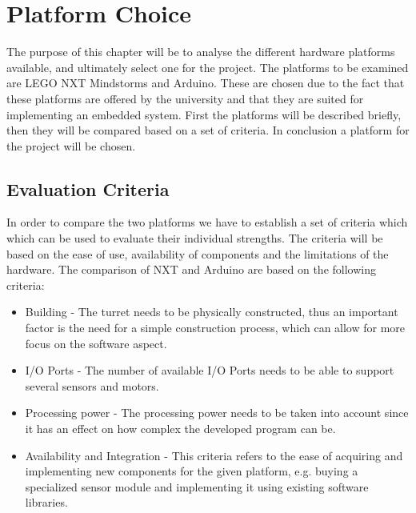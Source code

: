\chapter{Platform Choice}\label{PlatformC}
The purpose of this chapter will be to analyse the different hardware platforms
available, and ultimately select one for the project. The platforms to be examined are LEGO
NXT Mindstorms and Arduino. These are chosen due to the fact that these
platforms are offered by the university and that they are suited for
implementing an embedded system. First the platforms will be described briefly,
then they will be compared based on a set of criteria. In conclusion a platform
for the project will be chosen.

\section{Evaluation Criteria}\label{EvalCrit}
In order to compare the two platforms we have to establish a set of criteria
which which can be used to evaluate their individual strengths. The criteria
will be based on the ease of use, availability of components and the limitations
of the hardware. The comparison of NXT and Arduino are based on the following
criteria:

\begin{itemize}
  \item Building - The turret needs to be physically constructed, thus an
  important factor is the need for a simple construction process, which can
  allow for more focus on the software aspect.
  \item I/O Ports - The number of available I/O Ports needs to be able to
  support several sensors and motors.
  \item Processing power - The processing power needs to be taken into account
  since it has an effect on how complex the developed program can be.
  \item Availability and Integration - This criteria refers to the ease of
  acquiring and implementing new components for the given platform, e.g. buying
  a specialized sensor module and implementing it using existing software
  libraries.
\end{itemize}

